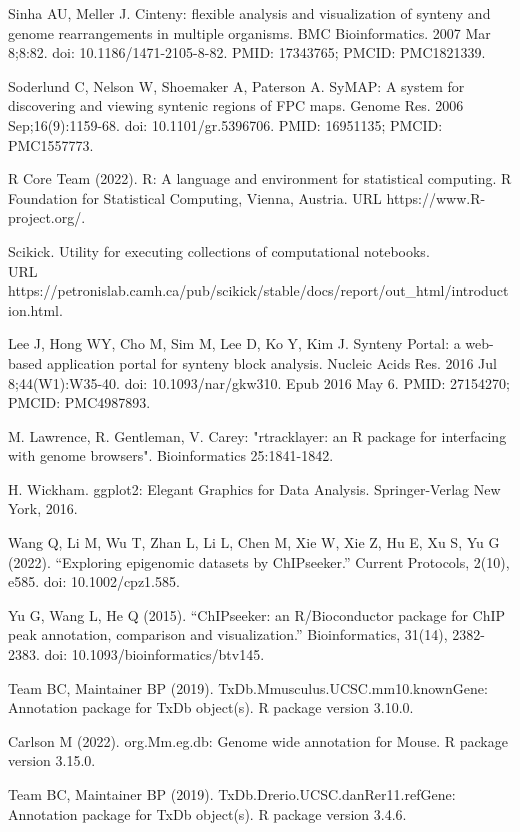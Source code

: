 \documentclass[12pt]{article}
\begin{document}
\begin{thebibliography}{99}
 Sinha AU, Meller J. Cinteny: flexible analysis and
visualization of synteny and genome rearrangements in multiple organisms.
BMC Bioinformatics. 2007 Mar 8;8:82. doi: 10.1186/1471-2105-8-82.
PMID: 17343765; PMCID: PMC1821339.

 Soderlund C, Nelson W, Shoemaker A, Paterson A. SyMAP: A system
for discovering and viewing syntenic regions of FPC maps. Genome Res. 2006
Sep;16(9):1159-68. doi: 10.1101/gr.5396706. PMID: 16951135; PMCID: PMC1557773.

 R Core Team (2022).
R: A language and environment for statistical computing. R Foundation
for Statistical Computing, Vienna, Austria. URL https://www.R-project.org/.

 Scikick. Utility for executing collections of computational
notebooks.\\
URL https://petronislab.camh.ca/pub/scikick/stable/docs/report/out\_html/introduction.html.

 Lee J, Hong WY, Cho M, Sim M, Lee D, Ko Y, Kim J. Synteny
Portal: a web-based application portal for synteny block analysis. Nucleic
Acids Res. 2016 Jul 8;44(W1):W35-40. doi: 10.1093/nar/gkw310. Epub 2016 May 6.
PMID: 27154270; PMCID: PMC4987893.

 M. Lawrence, R. Gentleman, V. Carey: "rtracklayer: an {R}
package for interfacing with genome browsers". Bioinformatics 25:1841-1842.

 H. Wickham. ggplot2: Elegant Graphics for Data Analysis.
Springer-Verlag New York, 2016.

 Wang Q, Li M, Wu T, Zhan L, Li L, Chen M, Xie W, Xie Z, Hu E,
Xu S, Yu G (2022). “Exploring epigenomic datasets by ChIPseeker.” Current
Protocols, 2(10), e585. doi: 10.1002/cpz1.585.

 Yu G, Wang L, He Q (2015). “ChIPseeker: an R/Bioconductor
package for ChIP peak annotation, comparison and visualization.”
Bioinformatics, 31(14), 2382-2383. doi: 10.1093/bioinformatics/btv145.

 Team BC, Maintainer BP (2019).
TxDb.Mmusculus.UCSC.mm10.knownGene: Annotation package for TxDb object(s).
R package version 3.10.0.

 Carlson M (2022). org.Mm.eg.db: Genome wide annotation for
Mouse. R package version 3.15.0.

 Team BC, Maintainer BP (2019).
TxDb.Drerio.UCSC.danRer11.refGene: Annotation package for TxDb object(s).
R package version 3.4.6.


\end{thebibliography}
\end{document}
